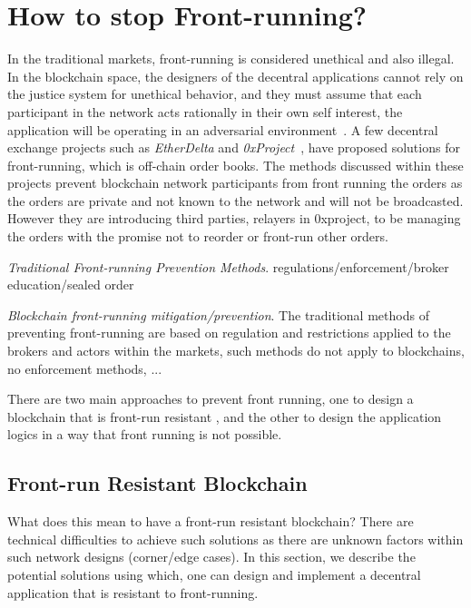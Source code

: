 \section{How to stop Front-running?} %

In the traditional markets, front-running is considered unethical and also illegal. In the blockchain space, the designers of the decentral applications cannot rely on the justice system for unethical behavior, and they must assume that each participant in the network acts rationally in their own self interest, the application will be operating in an adversarial environment~\cite{0xfrontrunning:online}.
A few decentral exchange projects such as \textit{EtherDelta} and \textit{0xProject}~\cite{warren20170x}, have proposed solutions for front-running, which is off-chain order books. The methods discussed within these projects prevent blockchain network participants from front running the orders as the orders are private and not known to the network and will not be broadcasted. However they are introducing third parties, \eg relayers in 0xproject, to be managing the orders with the promise not to reorder or front-run other orders. 

\emph{Traditional Front-running Prevention Methods}. regulations/enforcement/broker education/sealed order


\emph{Blockchain front-running mitigation/prevention}. The traditional methods of preventing front-running are based on regulation and restrictions applied to the brokers and actors within the markets, such methods do not apply to blockchains, no enforcement methods, ... 

There are two main approaches to prevent front running, one to design a blockchain that is front-run resistant , and the other to design the application logics in a way that front running is not possible. 

\subsection{Front-run Resistant Blockchain}
What does this mean to have a front-run resistant blockchain?  There are technical difficulties to achieve such solutions as there are unknown factors within such network designs (corner/edge cases). In this section, we describe the potential solutions using which, one can design and implement a decentral application that is resistant to front-running.

